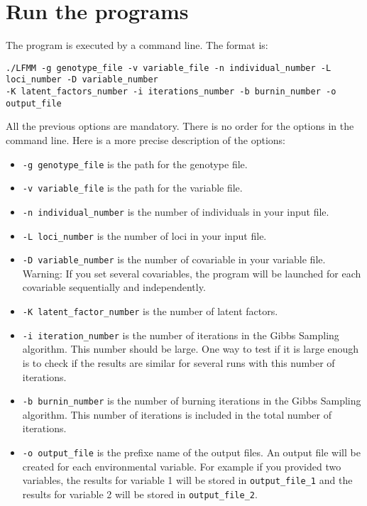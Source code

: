 \documentclass[10pt,a4paper]{article}
\begin{document}
\section{Run the programs}
The program is executed by a command line. The format is:
\begin{Verbatim}[frame=single]
./LFMM -g genotype_file -v variable_file -n individual_number -L loci_number -D variable_number 
-K latent_factors_number -i iterations_number -b burnin_number -o output_file
\end{Verbatim}

\noindent
All the previous options are mandatory. There is no order for the options in the command line. 
Here is a more precise description of the options:
\begin{itemize}
\item \verb|-g genotype_file| is the path for the genotype file.
\item \verb|-v variable_file| is the path for the variable file.
\item \verb|-n individual_number| is the number of individuals in your input file.
\item \verb|-L loci_number| is the number of loci in your input file.
\item \verb|-D variable_number| is the number of covariable in your variable file.
Warning: If you set several covariables, the program will be launched for each covariable sequentially
and independently.
\item \verb|-K latent_factor_number| is the number of latent factors. 
\item \verb|-i iteration_number| is the number of iterations in the Gibbs Sampling algorithm. This number
should be large. One way to test if it is large enough is to check if the results are
similar for several runs with this number of iterations.
\item \verb|-b burnin_number| is the number of burning iterations in the Gibbs Sampling algorithm. This
number of iterations is included in the total number of iterations.  
\item \verb|-o output_file| is the prefixe name of the output files. An output file will be created for each environmental variable. For example if you provided two variables, the results for variable 1 will
be stored in \verb|output_file_1| and  the results for variable 2 will
be stored in \verb|output_file_2|.
\end{itemize}
\end{document}
